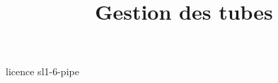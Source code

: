 \documentclass [xcolor=table] {beamer}
\title {Gestion des tubes}
\begin{document}
 {licence}
 {sl1-6-pipe}
\end{document}
